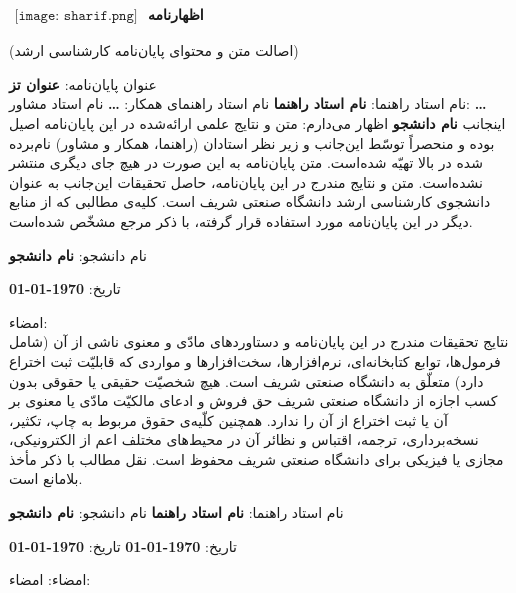 \chapter*{}
\large
$
\begin{array}{l}
\texttt{[image: sharif.png]}
\end{array}
$ \hspace{4.7cm} \textbf{اظهارنامه}
\small
\begin{center}
(اصالت متن و محتوای پایان‌نامه کارشناسی ارشد) \\
\end{center}
\vspace{0.5cm}
عنوان پایان‌نامه: 
\textbf{عنوان تز}
\\
نام استاد راهنما: 
\textbf{نام استاد راهنما}
 \hfill
نام استاد راهنمای همکار: 
\textbf{\ldots}
 \hfill
نام استاد مشاور: 
 \textbf{\ldots}
 \vspace{0.5cm}
 \\
 اینجانب \textbf{نام دانشجو} اظهار می‌دارم:
  متن و نتایج علمی ارائه‌شده در این پایان‌نامه اصیل بوده و منحصراً توسّط این‌جانب و زیر نظر استادان (راهنما، همکار و مشاور) نام‌برده شده در بالا تهیّه شده‌است.
  متن پایان‌نامه به این صورت در هیچ جای دیگری منتشر نشده‌است.
  متن و نتایج مندرج در این پایان‌نامه، حاصل تحقیقات این‌جانب به عنوان دانشجوی کارشناسی ارشد دانشگاه صنعتی شریف است.
  کلیه‌ی مطالبی که از منابع دیگر در این پایان‌نامه مورد استفاده قرار گرفته، با ذکر مرجع مشخّص شده‌است.
\vspace{0.5cm}

\hspace{8cm} نام دانشجو: \textbf{نام دانشجو}

\hspace{8cm} تاریخ: \textbf{\today}

\hspace{8cm} امضاء:
\vspace{0.5cm}
\\
نتایج تحقیقات مندرج در این پایان‌نامه و دستاوردهای مادّی و معنوی ناشی از آن (شامل فرمول‌ها، توابع کتابخانه‌ای، نرم‌افزارها، سخت‌افزارها و مواردی که قابلیّت ثبت اختراع دارد) متعلّق به دانشگاه صنعتی شریف است. هیچ شخصیّت حقیقی یا حقوقی بدون کسب اجازه از دانشگاه صنعتی شریف حق فروش و ادعای مالکیّت مادّی یا معنوی بر آن یا ثبت اختراع از آن را ندارد. همچنین کلّیه‌ی حقوق مربوط به چاپ، تکثیر، نسخه‌برداری، ترجمه، اقتباس و نظائر آن در محیط‌های مختلف اعم از الکترونیکی، مجازی یا فیزیکی برای دانشگاه صنعتی شریف محفوظ است. نقل مطالب با ذکر مأخذ بلامانع است.

\vspace{0.5cm}
نام استاد راهنما: \textbf{نام استاد راهنما}
\hspace{2.9cm}
نام دانشجو: \textbf{نام دانشجو}

تاریخ: \textbf{\today}
\hspace{5.1cm}
تاریخ: \textbf{\today}

امضاء: 
\hspace{7cm}
امضاء: 

\normalsize
